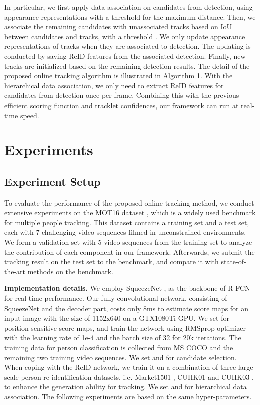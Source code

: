 \documentclass{article}
\begin{document}
In particular, we first apply data association on candidates from detection,
using appearance representations with a threshold  for the maximum distance.
Then, we associate the remaining candidates with unassociated tracks based on 
IoU between candidates and tracks, with a threshold .
We only update appearance representations of tracks when they are associated to detection.
The updating is conducted by saving ReID features from the associated detection.
Finally, new tracks are initialized based on the remaining detection results.
The detail of the proposed online tracking algorithm
is illustrated in Algorithm 1. 
With the hierarchical data association,
we only need to extract ReID features for candidates from detection once per frame.
Combining this with the previous efficient scoring function and tracklet confidences,
our framework can run at real-time speed.




\section{Experiments}
\label{sec:exp}

\subsection{Experiment Setup}
To evaluate the performance of the proposed online tracking method,
we conduct extensive experiments on the MOT16 dataset \cite{milan2016mot16},
which is a widely used benchmark for multiple people tracking.
This dataset contains a training set and a test set, 
each with 7 challenging video sequences filmed in unconstrained environments.
We form a validation set with 5 video sequences from the training set
to analyze the contribution of each component in our framework.
Afterwards, we submit the tracking result on the test set to the benchmark, and
compare it with state-of-the-art methods on the benchmark.


\textbf{Implementation details.}
We employ SqueezeNet \cite{iandola2016squeezenet}, 
as the backbone of R-FCN for real-time performance.
Our fully convolutional network, consisting of SqueezeNet and the decoder part,
costs only 8ms to estimate score maps for an input image with the size of 1152x640 on a GTX1080Ti GPU.
We set  for position-sensitive score maps, and train the network
using RMSprop optimizer with the learning rate of 1e-4 and the batch size of 32 for 20k iterations.
The training data for person classification is collected from MS COCO \cite{lin2014microsoft}
and the remaining two training video sequences.
We set  and  for candidate selection.
When coping with the ReID network, 
we train it on a combination of three large scale person re-identification datasets,
i.e. Market1501 \cite{zheng2015scalable}, CUHK01 and CUHK03 \cite{li2014deepreid}, to enhance the generation ability for tracking.
We set  and  for hierarchical data association.
The following experiments are based on the same hyper-parameters.
\end{document}
